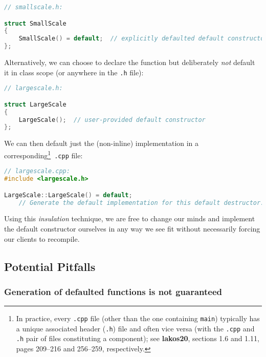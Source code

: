 \begin{lstlisting}[language=C++]
// smallscale.h:

struct SmallScale
{
    SmallScale() = default;  // explicitly defaulted default constructor
};
\end{lstlisting}

\noindent Alternatively, we can choose to declare the function but deliberately
\emph{not} default it in class scope (or anywhere in the \texttt{.h}
file):

\begin{lstlisting}[language=C++]
// largescale.h:

struct LargeScale
{
    LargeScale();  // user-provided default constructor
};
\end{lstlisting}

\noindent We can then default just the (non-inline) implementation in a
corresponding{\cprotect\footnote{In practice, every \texttt{.cpp} file
(other than the one containing \texttt{main}) typically has a unique
associated header (\texttt{.h}) file and often vice versa  (with the \texttt{.cpp} and \texttt{.h} pair of files constituting a component); see \textbf{{lakos20}}, sections 1.6 and 1.11,
  pages 209--216 and 256--259, respectively.}}~\texttt{.cpp} file:

\begin{lstlisting}[language=C++]
// largescale.cpp:
#include <largescale.h>

LargeScale::LargeScale() = default;
    // Generate the default implementation for this default destructor.
\end{lstlisting}

\noindent Using this \emph{insulation} technique, we are free to change our minds
and implement the default constructor ourselves in any way we see fit
without necessarily forcing our clients to recompile.

\subsection[Potential Pitfalls]{Potential Pitfalls}\label{potential-pitfalls}

\subsubsection[Generation of defaulted functions is not guaranteed]{Generation of defaulted functions is not guaranteed}\label{generation-of-defaulted-functions-is-not-guaranteed}


